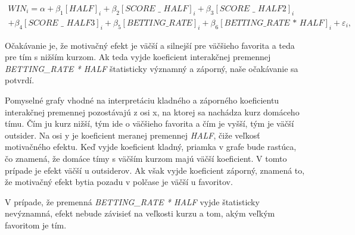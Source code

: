 \documentclass[
  digital, %
  twoside, %
  notable,   %
  lof,     %
  lot,     %
]{fithesis3}
\begin{document}
	\begin{multline}
	WIN_{i} = \alpha + \beta _{1} [\textit{HALF}]_{i} + \beta _{2} [\textit{SCORE~\_~HALF}]_{i} + \beta _{3} [\textit{SCORE~\_~HALF2}]_{i} \\
	+ \beta _{4} [\textit{SCORE~\_~HALF3}]_{i} + \beta _{5} [\textit{BETTING\_RATE}]_{i} + \beta _{6} [\textit{BETTING\_RATE * HALF}]_{i} + \varepsilon_{i},
	\end{multline}
	
	Očakávanie je, že motivačný efekt je väčší a silnejší pre väčšieho favorita a teda pre tím s nižším kurzom. Ak teda vyjde koeficient interakčnej premennej \textit{BETTING\_RATE * HALF} štatisticky významný  a záporný, naše očakávanie sa potvrdí. 
	
	Pomyselné grafy vhodné na interpretáciu kladného a záporného koeficientu interakčnej premennej pozostávajú z osi x, na ktorej sa nachádza kurz domáceho tímu. Čím ju kurz nižší, tým ide o väčšieho favorita a čím je vyšší, tým je väčší outsider. Na osi y je koeficient meranej premennej \textit{HALF}, čiže veľkosť motivačného efektu. Keď vyjde koeficient kladný, priamka v grafe bude rastúca, čo znamená, že domáce tímy s väčším kurzom majú väčší koeficient. V tomto prípade je efekt väčší u outsiderov. Ak však vyjde koeficient záporný, znamená to, že motivačný efekt bytia pozadu v polčase je väčší u favoritov.
	
	V prípade, že premenná \textit{BETTING\_RATE * HALF} vyjde štatisticky nevýznamná, efekt nebude závisieť na veľkosti kurzu a tom, akým veľkým favoritom je tím.
	
\end{document}
